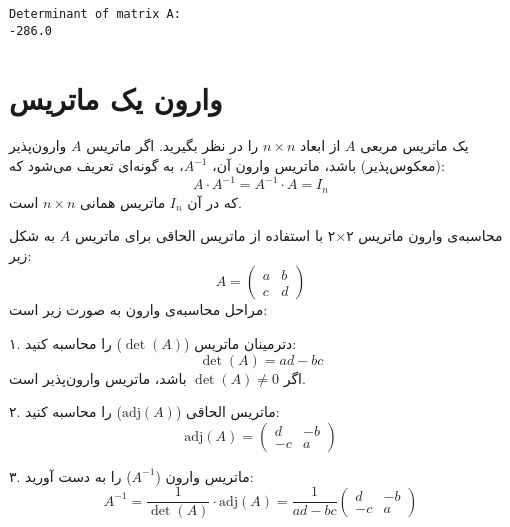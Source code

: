 \begin{code}
		\begin{latin}
			  
			\texttt{Determinant of matrix A:\\
				-286.0}
		\end{latin}

\end{code}
\section{وارون یک ماتریس}
	
\begin{definition}
	
	یک ماتریس مربعی \( A \) از ابعاد \( n \times n \) را در نظر بگیرید. اگر ماتریس \( A \) وارون‌پذیر (معکوس‌پذیر) باشد، ماتریس وارون آن، \( A^{-1} \)، به گونه‌ای تعریف می‌شود که:
	\[
	A \cdot A^{-1} = A^{-1} \cdot A = I_n
	\]
	که در آن \( I_n \) ماتریس همانی \( n \times n \) است.
	

\end{definition}
	\begin{nokteh}
		
	محاسبه‌ی وارون ماتریس ۲×۲ با استفاده از ماتریس الحاقی
	برای ماتریس \( A \) به شکل زیر:
	\[
	A = \begin{pmatrix}
		a & b \\
		c & d
	\end{pmatrix}
	\]
	مراحل محاسبه‌ی وارون به صورت زیر است:
	
	۱. دترمینان ماتریس (\( \det(A) \)) را محاسبه کنید:
	\[
	\det(A) = ad - bc
	\]
	اگر \( \det(A) \neq 0 \) باشد، ماتریس وارون‌پذیر است.
	
	۲. ماتریس الحاقی (\( \text{adj}(A) \)) را محاسبه کنید:
	\[
	\text{adj}(A) = \begin{pmatrix}
		d & -b \\
		-c & a
	\end{pmatrix}
	\]
	
	۳. ماتریس وارون (\( A^{-1} \)) را به دست آورید:
	\[
	A^{-1} = \frac{1}{\det(A)} \cdot \text{adj}(A) = \frac{1}{ad - bc} \begin{pmatrix}
		d & -b \\
		-c & a
	\end{pmatrix}
	\]
	

	\end{nokteh}
	
